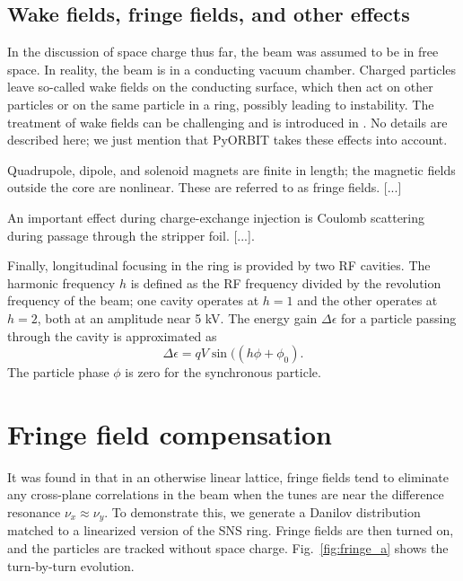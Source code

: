 \subsection{Wake fields, fringe fields, and other effects}

In the discussion of space charge thus far, the beam was assumed to be in free space. In reality, the beam is in a conducting vacuum chamber. Charged particles leave so-called wake fields on the conducting surface, which then act on other particles or on the same particle in a ring, possibly leading to instability. The treatment of wake fields can be challenging and is introduced in \cite{Chao1993}. No details are described here; we just mention that PyORBIT takes these effects into account.

Quadrupole, dipole, and solenoid magnets are finite in length; the magnetic fields outside the core are nonlinear. These are referred to as fringe fields. [...]

An important effect during charge-exchange injection is Coulomb scattering during passage through the stripper foil. [...].

Finally, longitudinal focusing in the ring is provided by two RF cavities. The harmonic frequency $h$ is defined as the RF frequency divided by the revolution frequency of the beam; one cavity operates at $h = 1$ and the other operates at $h = 2$, both at an amplitude near 5 kV. The energy gain $\Delta \epsilon$ for a particle passing through the cavity is approximated as  
%
\begin{equation}
    \Delta \epsilon = q V \sin((h \phi + \phi_0).
\end{equation}
%
The particle phase $\phi$ is zero for the synchronous particle.



\section{Fringe field compensation}

It was found in \cite{Holmes2018} that in an otherwise linear lattice, fringe fields tend to eliminate any cross-plane correlations in the beam when the tunes are near the difference resonance $\nu_x \approx \nu_y$. To demonstrate this, we generate a Danilov distribution matched to a linearized version of the SNS ring. Fringe fields are then turned on, and the particles are tracked without space charge. Fig.~\ref{fig:fringe_a} shows the turn-by-turn evolution.

